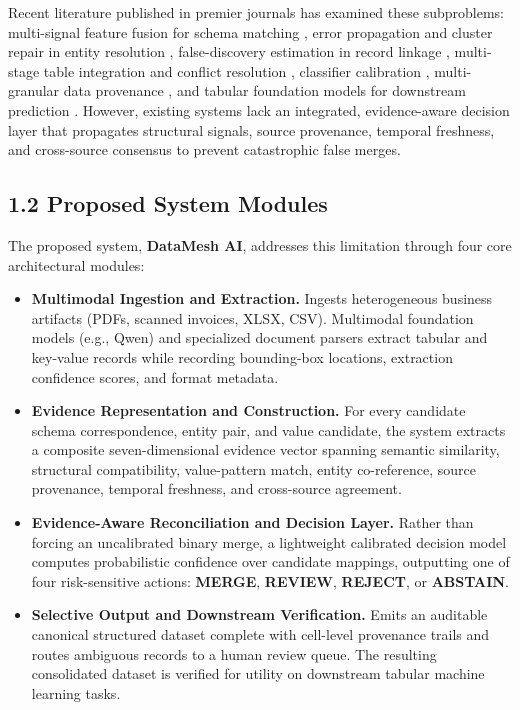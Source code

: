 \documentclass[12pt,a4paper]{article}
\begin{document}
Recent literature published in premier journals has examined these subproblems: multi-signal feature fusion for schema matching \cite{smutf2025}, error propagation and cluster repair in entity resolution \cite{christen2025cluster}, false-discovery estimation in record linkage \cite{robach2025falsediscovery}, multi-stage table integration and conflict resolution \cite{ji2025tableintegration}, classifier calibration \cite{silvafilho2023calibration}, multi-granular data provenance \cite{gregori2025prolit}, and tabular foundation models for downstream prediction \cite{hollmann2025tabpfn}. However, existing systems lack an integrated, evidence-aware decision layer that propagates structural signals, source provenance, temporal freshness, and cross-source consensus to prevent catastrophic false merges.

\subsection*{1.2 Proposed System Modules}

The proposed system, \textbf{DataMesh AI}, addresses this limitation through four core architectural modules:

\begin{itemize}
  \item \textbf{Multimodal Ingestion and Extraction.} Ingests heterogeneous business artifacts (PDFs, scanned invoices, XLSX, CSV). Multimodal foundation models (e.g., Qwen) and specialized document parsers extract tabular and key-value records while recording bounding-box locations, extraction confidence scores, and format metadata.
  \item \textbf{Evidence Representation and Construction.} For every candidate schema correspondence, entity pair, and value candidate, the system extracts a composite seven-dimensional evidence vector spanning semantic similarity, structural compatibility, value-pattern match, entity co-reference, source provenance, temporal freshness, and cross-source agreement.
  \item \textbf{Evidence-Aware Reconciliation and Decision Layer.} Rather than forcing an uncalibrated binary merge, a lightweight calibrated decision model computes probabilistic confidence over candidate mappings, outputting one of four risk-sensitive actions: \textbf{MERGE}, \textbf{REVIEW}, \textbf{REJECT}, or \textbf{ABSTAIN}.
  \item \textbf{Selective Output and Downstream Verification.} Emits an auditable canonical structured dataset complete with cell-level provenance trails and routes ambiguous records to a human review queue. The resulting consolidated dataset is verified for utility on downstream tabular machine learning tasks.
\end{itemize}
\end{document}
